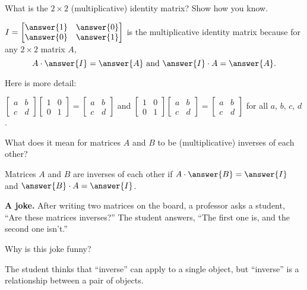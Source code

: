 \documentclass[space,nooutcomes]{ximera}
\begin{document}
\begin{question}
What is the $2\times 2$ (multiplicative) identity matrix?  Show how you know.
\begin{solution}
$I = \begin{bmatrix} \answer{1}&\answer{0} \\ \answer{0}&\answer{1} \end{bmatrix}$ is the multiplicative identity matrix because for any $2\times 2$ matrix $A$, 
\[
A\cdot\answer{I} = \answer{A}\text{ and }\answer{I}\cdot A=\answer{A}.  
\]
\begin{question}
Here is more detail:  

$\begin{bmatrix} a&b \\ c&d \end{bmatrix}  \begin{bmatrix} 1&0 \\ 0&1 \end{bmatrix} = 
\begin{bmatrix} a&b \\ c&d \end{bmatrix}$  
and
$\begin{bmatrix} 1&0 \\ 0&1 \end{bmatrix} \begin{bmatrix} a&b \\ c&d \end{bmatrix} = 
\begin{bmatrix} a&b \\ c&d \end{bmatrix}$  for all $a$, $b$, $c$, $d$.  
\end{question}
\end{solution}
\end{question}

\begin{question}
What does it mean for matrices $A$ and $B$ to be (multiplicative) inverses of each other?  

\begin{solution}
Matrices $A$ and $B$ are inverses of each other if $A\cdot\answer{B}=\answer{I}$ and $\answer{B}\cdot A=\answer{I}$.  
\end{solution}
\end{question}

\textbf{A joke.}  After writing two matrices on the board, a professor asks a student, ``Are these matrices inverses?''  The student answers, ``The first one is, and the second one isn't.''  
\begin{question}
Why is this joke funny?  
\begin{freeResponse}
\begin{hint}
The student thinks that ``inverse'' can apply to a single object, but ``inverse'' is a relationship between a pair of objects.  
\end{hint}
\end{freeResponse}
\end{question}
\end{document}
